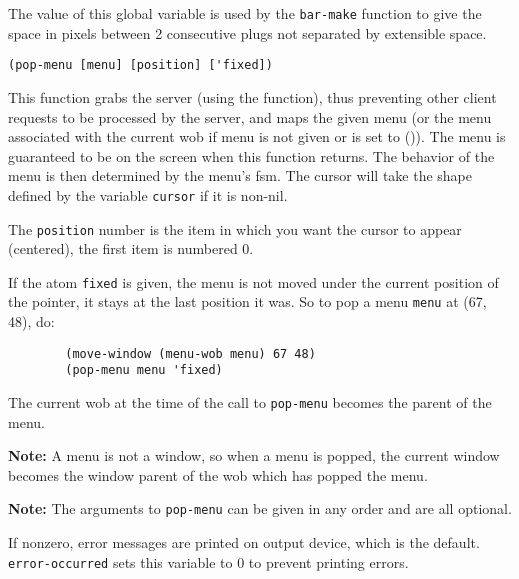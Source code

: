         

The value of this global variable is used by the \verb"bar-make" function to
give the space in pixels between 2 consecutive plugs not separated by
extensible space.

        
{\usagefont\begin{verbatim}
(pop-menu [menu] [position] ['fixed])
\end{verbatim}}\usageupspace

This function grabs the server (using the  function), thus
preventing other client requests to be processed by the server, and maps the
given menu (or the menu associated with the current wob if menu
is not given or is set to ()). The menu is guaranteed to be on the screen
when this function returns.
The behavior of the menu is then determined by
the menu's fsm. The cursor will take the shape defined by the variable
\verb"cursor" if it is  non-nil.

The \verb"position" number is the item in which you want the cursor to appear
(centered), the first item is numbered 0.

If the atom \verb"fixed" is given, the menu is not moved under the current
position of the pointer, it stays at the last position it was. So to pop a
menu \verb"menu" at (67, 48), do:

{\exemplefont\begin{verbatim}
        (move-window (menu-wob menu) 67 48)
        (pop-menu menu 'fixed)
\end{verbatim}}

The current wob at the time of the call to \verb"pop-menu" becomes the
parent of the menu.

{\bf Note:} A menu is not a {\GWM} window, so when a menu is popped, 
the current
window becomes the window parent of the wob which has popped the menu.

{\bf Note:} The arguments to \verb"pop-menu" can be given in any order and
are all optional.



If nonzero, {\WOOL} error messages are printed on {\GWM} output device,
which is the default. \verb"error-occurred" sets this variable to 0 to
prevent printing errors.

